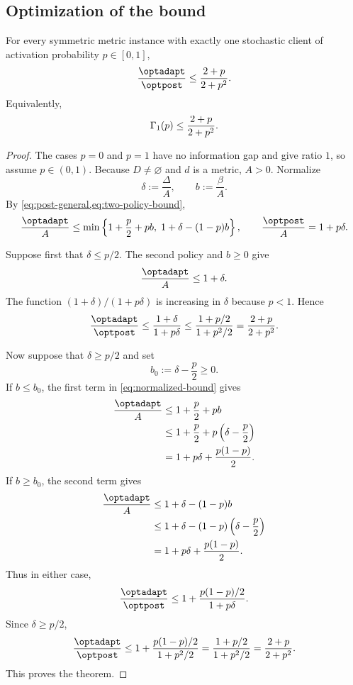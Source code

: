 \subsection{Optimization of the bound}

\begin{theorem}\label{thm:general-upper}
For every symmetric metric instance with exactly one stochastic client of
activation probability $p\in[0,1]$,
\[
  \frac{\optadapt}{\optpost}
  \le\frac{2+p}{2+p^2}.
\]
Equivalently,
\[
  \Gamma_{1}(p)\le\frac{2+p}{2+p^2}.
\]
\end{theorem}

\begin{proof}
The cases $p=0$ and $p=1$ have no information gap and give ratio $1$, so
assume $p\in(0,1)$.  Because $D\ne\varnothing$ and $d$ is a metric, $A>0$.  Normalize
\[
  \delta:=\frac{\Delta}{A},
  \qquad
  b:=\frac{\beta}{A}.
\]
By \cref{eq:post-general,eq:two-policy-bound},
\begin{equation}\label{eq:normalized-bound}
  \frac{\optadapt}{A}
  \le
  \min\left\{
    1+\frac p2+pb,
    \;1+\delta-(1-p)b
  \right\},
  \qquad
  \frac{\optpost}{A}=1+p\delta.
\end{equation}

Suppose first that $\delta\le p/2$.  The second policy and $b\ge0$ give
\[
  \frac{\optadapt}{A}\le1+\delta.
\]
The function $(1+\delta)/(1+p\delta)$ is increasing in $\delta$ because
$p<1$.  Hence
\[
  \frac{\optadapt}{\optpost}
  \le\frac{1+\delta}{1+p\delta}
  \le\frac{1+p/2}{1+p^2/2}
  =\frac{2+p}{2+p^2}.
\]

Now suppose that $\delta\ge p/2$ and set
\[
  b_0:=\delta-\frac p2\ge0.
\]
If $b\le b_0$, the first term in \cref{eq:normalized-bound} gives
\[
\begin{aligned}
  \frac{\optadapt}{A}
  &\le1+\frac p2+pb\\
  &\le1+\frac p2+p\left(\delta-\frac p2\right)\\
  &=1+p\delta+\frac{p(1-p)}2.
\end{aligned}
\]
If $b\ge b_0$, the second term gives
\[
\begin{aligned}
  \frac{\optadapt}{A}
  &\le1+\delta-(1-p)b\\
  &\le1+\delta-(1-p)\left(\delta-\frac p2\right)\\
  &=1+p\delta+\frac{p(1-p)}2.
\end{aligned}
\]
Thus in either case,
\[
  \frac{\optadapt}{\optpost}
  \le
  1+\frac{p(1-p)/2}{1+p\delta}.
\]
Since $\delta\ge p/2$,
\[
  \frac{\optadapt}{\optpost}
  \le
  1+\frac{p(1-p)/2}{1+p^2/2}
  =\frac{1+p/2}{1+p^2/2}
  =\frac{2+p}{2+p^2}.
\]
This proves the theorem.
\end{proof}

